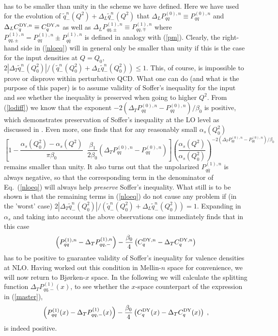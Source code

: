has to be smaller than unity in the scheme we have defined. Here we have used
for the evolution of $\tilde{q}_{-}^n (Q^2) + \Delta_L \tilde{q}_{-}^n (Q^2)$
that \cite{ap} $\Delta_L P_{qq}^{(0),n} \equiv P_{qq}^{(0),n}$ and
\cite{rat,weber} $\Delta_L C_q^{{\small {\rm DY}},n} \equiv 
C_q^{{\small {\rm DY}},n}$ as well as \cite{svw,grsv,wv} 
$\Delta_L P_{qq,\pm}^{(1),n} \equiv P_{qq,\mp}^{(1),n}$
where $P_{qq,\pm}^{(1),n} = P_{qq}^{(1),n} \pm P_{q\bar{q}}^{(1),n}$ 
is defined in analogy with (\ref{pm}).
Clearly, the right-hand side in (\ref{nloeq}) will in general only be 
smaller than unity if this is the case for the input densities at $Q=Q_0$, 
$2 |\Delta_T \tilde{q}_-^n (Q_0^2)|/(\tilde{q}_-^n (Q_0^2) + \Delta_L 
\tilde{q}_-^n (Q_0^2)) \leq 1$. This, of course, is impossible to 
prove or disprove within perturbative QCD. What one can do (and what is the
purpose of this paper) is to assume validity of Soffer's inequality for the 
input and see whether the inequality is preserved when going to
higher $Q^2$. From (\ref{lodiff}) we know that the exponent $-2 (\Delta_T 
P_{qq}^{(0),n}-P_{qq}^{(0),n}) / \beta_0$ is positive, which demonstrates
preservation of Soffer's inequality at the LO level as discussed in
\cite{bar}. Even more, one finds that for any reasonably small 
$\alpha_s (Q_0^2)$ 
\begin{equation}
\left[ 1-\frac{\alpha_s (Q_0^2)-\alpha_s (Q^2)}{\pi\beta_0}\! \; \; 
\frac{\beta_1}{2\beta_0} \left( \Delta_T P_{qq}^{(0),n}-P_{qq}^{(0),n}
\right) \right] \left( \frac{\alpha_s (Q^2)}{\alpha_s 
(Q_0^2)}\right)^{-2 (\Delta_T P_{qq}^{(0),n}-P_{qq}^{(0),n}) / \beta_0}
\end{equation}
remains smaller than unity. It also turns out that the unpolarized 
$P_{q\bar{q}}^{(1),n}$ is always negative, so that the corresponding term 
in the denominator of Eq.~(\ref{nloeq}) will always help {\em preserve} 
Soffer's inequality. What still is to be shown is that the remaining terms in 
(\ref{nloeq}) do not cause any problem if (in the 'worst' case)
$2|\Delta_T \tilde{q}_{-}^n (Q_0^2)|/(\tilde{q}_{-}^n (Q_0^2) +
\Delta_L \tilde{q}_{-}^n (Q_0^2))=1$. Expanding in $\alpha_s$ and taking into 
account the above observations one immediately finds that in this case
\begin{equation} \label{master}
\left( P_{qq}^{(1),n}-\Delta_T P_{qq,-}^{(1),n} \right) - 
\frac{\beta_0}{4} \left( C_q^{{\small {\rm DY}},n} - 
\Delta_T C_q^{{\small {\rm DY}},n} \right) 
\end{equation} 
has to be positive to guarantee validity of Soffer's inequality for valence
densities at NLO. Having worked out this condition in Mellin-$n$ space for 
convenience, we will now return to Bj\o rken-$x$ space.
In the following we will calculate the splitting function $\Delta_T 
P_{qq,-}^{(1)} (x)$, to see whether the $x$-space counterpart of the 
expression in (\ref{master}),
\begin{equation} \label{masterx}
\left( P_{qq}^{(1)}(x)-\Delta_T P_{qq,-}^{(1)}(x) \right) - 
\frac{\beta_0}{4} \left( C_q^{{\small {\rm DY}}} (x) - \Delta_T 
C_q^{{\small {\rm DY}}} (x) \right) \; ,
\end{equation} 
is indeed positive.

